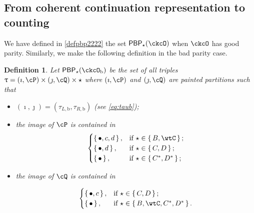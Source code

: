 \documentclass[12pt,a4paper]{amsart}
\def\abs#1{\left|{#1}\right|}
\numberwithin{equation}{section}
\newtheorem{defn}[thm]{Definition}
\theoremstyle{remark}
\def\half{{\tfrac{1}{2}}}
\def\Unip{\mathrm{Unip}}
\def\cupcol{{\stackrel{c}{\sqcup}}}
\def\cupcol{{\,\stackrel{c}{\sqcup}\,}}
\def\ckcOb{\ckcO_{\mathrm b}}
\def\ckcOpb{\ckcO'_{\mathrm b}}
\def\Gpb{G'_{\mathrm b}}
\def\PBPs{\mathsf{PBP}_{\star}}
\begin{document}
\subsection{From coherent continuation representation to counting}




We have defined in \eqref{defpbp2222} the set $\PBPs(\ckcO)$ when $\ckcO$ has good parity. Similarly, we make the following definition in the bad parity case.
\begin{defn}
  Let $\PBPs(\ckcOb)$ be the set of all triples
  $\uptau = (\imath,\cP)\times(\jmath,\cQ)\times \star $ where $(\imath,\cP)$ and
  $(\jmath,\cQ)$ are painted partitions such that
  \begin{itemize}
    \item $(\imath,\jmath) = (\tau_{L,\mathrm b},\tau_{R,\mathrm b})$ (see \eqref{eq:taub});
    \item the image of $\cP$ is contained in
          \[
          \begin{cases}
            \set{\bullet, c,d},  & \text{if } \star\in \set{B,\wtC}; \\
            \set{\bullet, d},  & \text{if } \star\in \set{C,D};\\
            \set{\bullet},  & \text{if } \star\in \set{C^{*},D^{*}};\\
          \end{cases}
          \]
    \item the image of $\cQ$ is contained in

          \[
          \begin{cases}
            \set{\bullet, c},  & \text{if } \star\in \set{C,D};\\
            \set{\bullet},  & \text{if } \star\in \set{B,\wtC, C^{*},D^{*}}.\\
          \end{cases}
          \]
  \end{itemize}
\end{defn}


\end{document}

